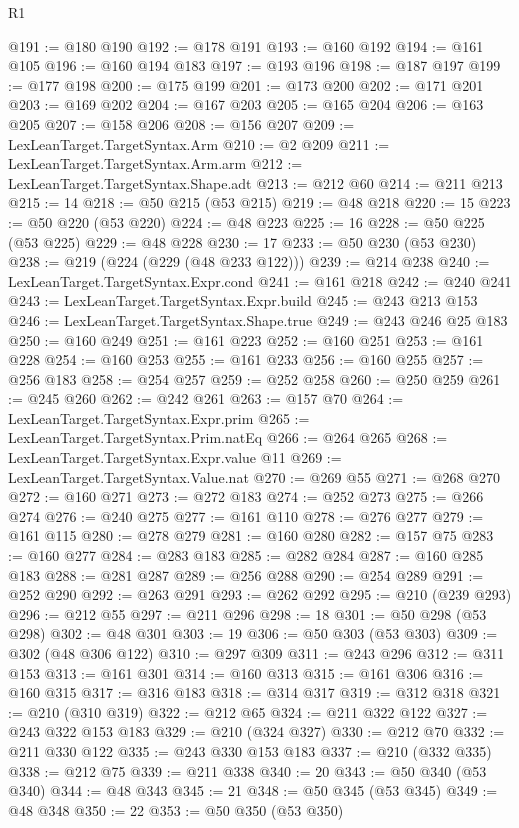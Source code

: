 \begin{lexlean}{R1}
\begin{coremodule}
@191 := @180 @190
@192 := @178 @191
@193 := @160 @192
@194 := @161 @105
@196 := @160 @194 @183
@197 := @193 @196
@198 := @187 @197
@199 := @177 @198
@200 := @175 @199
@201 := @173 @200
@202 := @171 @201
@203 := @169 @202
@204 := @167 @203
@205 := @165 @204
@206 := @163 @205
@207 := @158 @206
@208 := @156 @207
@209 := LexLeanTarget.TargetSyntax.Arm
@210 := @2 @209
@211 := LexLeanTarget.TargetSyntax.Arm.arm
@212 := LexLeanTarget.TargetSyntax.Shape.adt
@213 := @212 @60
@214 := @211 @213
@215 := 14
@218 := @50 @215 (@53 @215)
@219 := @48 @218
@220 := 15
@223 := @50 @220 (@53 @220)
@224 := @48 @223
@225 := 16
@228 := @50 @225 (@53 @225)
@229 := @48 @228
@230 := 17
@233 := @50 @230 (@53 @230)
@238 := @219 (@224 (@229 (@48 @233 @122)))
@239 := @214 @238
@240 := LexLeanTarget.TargetSyntax.Expr.cond
@241 := @161 @218
@242 := @240 @241
@243 := LexLeanTarget.TargetSyntax.Expr.build
@245 := @243 @213 @153
@246 := LexLeanTarget.TargetSyntax.Shape.true
@249 := @243 @246 @25 @183
@250 := @160 @249
@251 := @161 @223
@252 := @160 @251
@253 := @161 @228
@254 := @160 @253
@255 := @161 @233
@256 := @160 @255
@257 := @256 @183
@258 := @254 @257
@259 := @252 @258
@260 := @250 @259
@261 := @245 @260
@262 := @242 @261
@263 := @157 @70
@264 := LexLeanTarget.TargetSyntax.Expr.prim
@265 := LexLeanTarget.TargetSyntax.Prim.natEq
@266 := @264 @265
@268 := LexLeanTarget.TargetSyntax.Expr.value @11
@269 := LexLeanTarget.TargetSyntax.Value.nat
@270 := @269 @55
@271 := @268 @270
@272 := @160 @271
@273 := @272 @183
@274 := @252 @273
@275 := @266 @274
@276 := @240 @275
@277 := @161 @110
@278 := @276 @277
@279 := @161 @115
@280 := @278 @279
@281 := @160 @280
@282 := @157 @75
@283 := @160 @277
@284 := @283 @183
@285 := @282 @284
@287 := @160 @285 @183
@288 := @281 @287
@289 := @256 @288
@290 := @254 @289
@291 := @252 @290
@292 := @263 @291
@293 := @262 @292
@295 := @210 (@239 @293)
@296 := @212 @55
@297 := @211 @296
@298 := 18
@301 := @50 @298 (@53 @298)
@302 := @48 @301
@303 := 19
@306 := @50 @303 (@53 @303)
@309 := @302 (@48 @306 @122)
@310 := @297 @309
@311 := @243 @296
@312 := @311 @153
@313 := @161 @301
@314 := @160 @313
@315 := @161 @306
@316 := @160 @315
@317 := @316 @183
@318 := @314 @317
@319 := @312 @318
@321 := @210 (@310 @319)
@322 := @212 @65
@324 := @211 @322 @122
@327 := @243 @322 @153 @183
@329 := @210 (@324 @327)
@330 := @212 @70
@332 := @211 @330 @122
@335 := @243 @330 @153 @183
@337 := @210 (@332 @335)
@338 := @212 @75
@339 := @211 @338
@340 := 20
@343 := @50 @340 (@53 @340)
@344 := @48 @343
@345 := 21
@348 := @50 @345 (@53 @345)
@349 := @48 @348
@350 := 22
@353 := @50 @350 (@53 @350)

\end{coremodule}
\end{lexlean}
